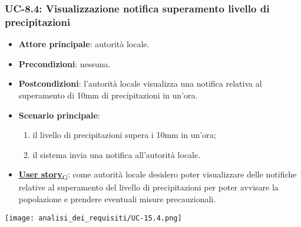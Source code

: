 \subsubsection{UC-8.4: Visualizzazione notifica superamento livello di precipitazioni}
\begin{itemize}
	\item \textbf{Attore principale}: autorità locale.
	\item \textbf{Precondizioni}: nessuna.
	\item \textbf{Postcondizioni}: l'autorità locale visualizza una notifica relativa al superamento di 10mm di precipitazioni in un'ora.
	\item \textbf{Scenario principale}:
	      \begin{enumerate}
		      \item il livello di precipitazioni supera i 10mm in un'ora;
		      \item il sistema invia una notifica all'autorità locale.
	      \end{enumerate}
	\item \href{https://7last.github.io/docs/pb/documentazione-interna/glossario\#user-story}{\textbf{User story}\textsubscript{G}}:
	      come autorità locale desidero poter visualizzare delle notifiche relative al superamento del livello di precipitazioni
	      per poter avvisare la popolazione e prendere eventuali misure precauzionali.
\end{itemize}
\begin{center}
	\texttt{[image: analisi\_dei\_requisiti/UC-15.4.png]}
\end{center}